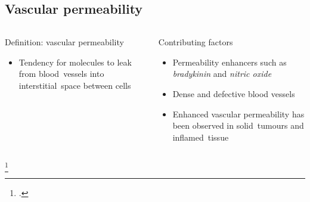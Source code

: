 \documentclass[aspectratio=169,compress]{beamer}
\newcommand*{\autotitle}{\subsecname\hfill\textbf{\small\secname}}
\begin{document}
\subsection{Vascular permeability}
\begin{frame}{\autotitle}
  \begin{columns}
      \begin{block}{Definition: vascular permeability}
        \begin{itemize}
          \item Tendency for molecules to leak from \alert{blood~vessels} into \alert{interstitial~space} between cells
        \end{itemize}
      \end{block}

      \begin{block}{Contributing factors}
        \begin{itemize}
          \item Permeability enhancers such as \emph{bradykinin} and \emph{nitric oxide}
          \item Dense and defective blood vessels
          \item Enhanced vascular permeability has been observed in \alert{solid~tumours} and \alert{inflamed~tissue}~
        \end{itemize}
      \end{block}

  \end{columns}
  \footcitetext{maeda2000tumor}
\end{frame}
\end{document}

